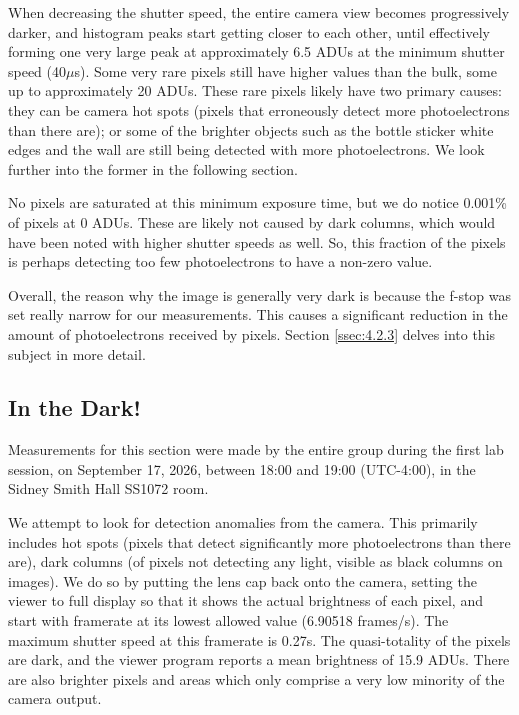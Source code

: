 \documentclass[preprint2]{aastex702}
\begin{document}
			When decreasing the shutter speed, the entire camera view becomes progressively darker, and histogram peaks start getting closer to each other, until effectively forming one very large peak at approximately 6.5 ADUs at the minimum shutter speed (40$\mu$s). Some very rare pixels still have higher values than the bulk, some up to approximately 20 ADUs. These rare pixels likely have two primary causes: they can be camera hot spots (pixels that erroneously detect more photoelectrons than there are); or some of the brighter objects such as the bottle sticker white edges and the wall are still being detected with more photoelectrons. We look further into the former in the following section.

			No pixels are saturated at this minimum exposure time, but we do notice 0.001\% of pixels at 0 ADUs. These are likely not caused by dark columns, which would have been noted with higher shutter speeds as well. So, this fraction of the pixels is perhaps detecting too few photoelectrons to have a non-zero value.

			Overall, the reason why the image is generally very dark is because the f-stop was set really narrow for our measurements. This causes a significant reduction in the amount of photoelectrons received by pixels. Section \ref{ssec:4.2.3} delves into this subject in more detail.

		\subsection{In the Dark!}\label{ssec:4.2.2}

			Measurements for this section were made by the entire group during the first lab session, on September 17, 2026, between 18:00 and 19:00 (UTC-4:00), in the Sidney Smith Hall SS1072 room.

			We attempt to look for detection anomalies from the camera. This primarily includes hot spots (pixels that detect significantly more photoelectrons than there are), dark columns (of pixels not detecting any light, visible as black columns on images). We do so by putting the lens cap back onto the camera, setting the viewer to full display so that it shows the actual brightness of each pixel, and start with framerate at its lowest allowed value (6.90518 frames/s). The maximum shutter speed at this framerate is 0.27s. The quasi-totality of the pixels are dark, and the viewer program reports a mean brightness of 15.9 ADUs. There are also brighter pixels and areas which only comprise a very low minority of the camera output.
\end{document}
